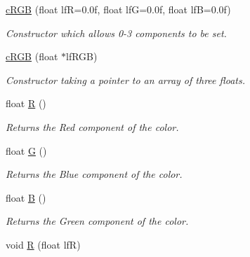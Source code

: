 \begin{DoxyCompactItemize}
\item 
\hypertarget{classc_r_g_b_a833a818aae27ee4dde171f2e317585d4}{
\hyperlink{classc_r_g_b_a833a818aae27ee4dde171f2e317585d4}{cRGB} (float lfR=0.0f, float lfG=0.0f, float lfB=0.0f)}
\label{classc_r_g_b_a833a818aae27ee4dde171f2e317585d4}

\begin{DoxyCompactList}\small\item\em Constructor which allows 0-\/3 components to be set. \end{DoxyCompactList}\item 
\hypertarget{classc_r_g_b_a9f0e889346aaec9a19b1a7fd2400a53e}{
\hyperlink{classc_r_g_b_a9f0e889346aaec9a19b1a7fd2400a53e}{cRGB} (float $\ast$lfRGB)}
\label{classc_r_g_b_a9f0e889346aaec9a19b1a7fd2400a53e}

\begin{DoxyCompactList}\small\item\em Constructor taking a pointer to an array of three floats. \end{DoxyCompactList}\item 
\hypertarget{classc_r_g_b_a701ca35633538dad46c30e2932543f1d}{
float \hyperlink{classc_r_g_b_a701ca35633538dad46c30e2932543f1d}{R} ()}
\label{classc_r_g_b_a701ca35633538dad46c30e2932543f1d}

\begin{DoxyCompactList}\small\item\em Returns the Red component of the color. \end{DoxyCompactList}\item 
\hypertarget{classc_r_g_b_a1e34ef9bd5e4379d6289600ce2c105ae}{
float \hyperlink{classc_r_g_b_a1e34ef9bd5e4379d6289600ce2c105ae}{G} ()}
\label{classc_r_g_b_a1e34ef9bd5e4379d6289600ce2c105ae}

\begin{DoxyCompactList}\small\item\em Returns the Blue component of the color. \end{DoxyCompactList}\item 
\hypertarget{classc_r_g_b_a41d85feae44ddfa8af7244d57a43b284}{
float \hyperlink{classc_r_g_b_a41d85feae44ddfa8af7244d57a43b284}{B} ()}
\label{classc_r_g_b_a41d85feae44ddfa8af7244d57a43b284}

\begin{DoxyCompactList}\small\item\em Returns the Green component of the color. \end{DoxyCompactList}\item 
\hypertarget{classc_r_g_b_a8ec1a9e2678f1cdc1d8c7bd85273dcfa}{
void \hyperlink{classc_r_g_b_a8ec1a9e2678f1cdc1d8c7bd85273dcfa}{R} (float lfR)}
\label{classc_r_g_b_a8ec1a9e2678f1cdc1d8c7bd85273dcfa}


\end{DoxyCompactItemize}
